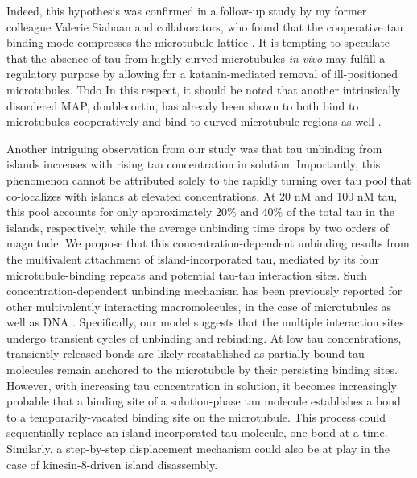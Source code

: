Indeed, this hypothesis was confirmed in a follow-up study by my former colleague Valerie Siahaan and collaborators, who found that the cooperative tau binding mode compresses the microtubule lattice \parencite{siahaan2022microtubule}. It is tempting to speculate that the absence of tau from highly curved microtubules \textit{in vivo} may fulfill a regulatory purpose by allowing for a katanin-mediated removal of ill-positioned microtubules. Todo In this respect, it should be noted that another intrinsically disordered MAP, doublecortin, has already been shown to both bind to microtubules cooperatively and bind to curved microtubule regions as well \parencite{Bechstedt2012, Bechstedt2014}. \par

Another intriguing observation from our study was that tau unbinding from islands increases with rising tau concentration in solution. Importantly, this phenomenon cannot be attributed solely to the rapidly turning over tau pool that co-localizes with islands at elevated concentrations. At 20 nM and 100 nM tau, this pool accounts for only approximately 20\% and 40\% of the total tau in the islands, respectively, while the average unbinding time drops by two orders of magnitude. We propose that this concentration-dependent unbinding results from the multivalent attachment of island-incorporated tau, mediated by its four microtubule-binding repeats and potential tau-tau interaction sites. Such concentration-dependent unbinding mechanism has been previously reported for other multivalently interacting macromolecules, in the case of microtubules as well as DNA \parencite{lanskydiffusible2015, sing2014multiple}. Specifically, our model suggests that the multiple interaction sites undergo transient cycles of unbinding and rebinding. At low tau concentrations, transiently released bonds are likely reestablished as partially-bound tau molecules remain anchored to the microtubule by their persisting binding sites. However, with increasing tau concentration in solution, it becomes increasingly probable that a binding site of a solution-phase tau molecule establishes a bond to a temporarily-vacated binding site on the microtubule. This process could sequentially replace an island-incorporated tau molecule, one bond at a time. Similarly, a step-by-step displacement mechanism could also be at play in the case of kinesin-8-driven island disassembly.\par

